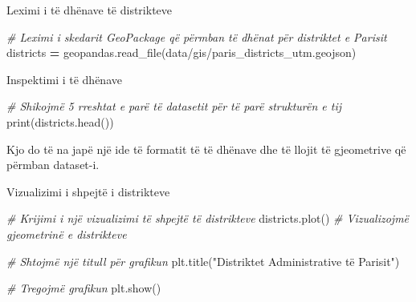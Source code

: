 \documentclass[
  ignorenonframetext,
]{beamer}
\newenvironment{Shaded}{\begin{snugshade}}{\end{snugshade}}
\newcommand{\BuiltInTok}[1]{#1}
\newcommand{\CommentTok}[1]{\textcolor[rgb]{0.56,0.35,0.01}{\textit{#1}}}
\newcommand{\NormalTok}[1]{#1}
\newcommand{\OperatorTok}[1]{\textcolor[rgb]{0.81,0.36,0.00}{\textbf{#1}}}
\newcommand{\StringTok}[1]{\textcolor[rgb]{0.31,0.60,0.02}{#1}}
\begin{document}
\begin{frame}[fragile]{Leximi i të dhënave të distrikteve}
\protect\hypertarget{leximi-i-tuxeb-dhuxebnave-tuxeb-distrikteve}{}

\begin{Shaded}
\begin{Highlighting}[]
\CommentTok{\# Leximi i skedarit GeoPackage që përmban të dhënat për distriktet e Parisit}
\NormalTok{districts }\OperatorTok{=}\NormalTok{ geopandas.read\_file(}\StringTok{\textquotesingle{}data/gis/paris\_districts\_utm.geojson\textquotesingle{}}\NormalTok{)}
\end{Highlighting}
\end{Shaded}
\end{frame}

\begin{frame}[fragile]{Inspektimi i të dhënave}
\protect\hypertarget{inspektimi-i-tuxeb-dhuxebnave-1}{}

\begin{Shaded}
\begin{Highlighting}[]
\CommentTok{\# Shikojmë 5 rreshtat e parë të datasetit për të parë strukturën e tij}
\BuiltInTok{print}\NormalTok{(districts.head())}
\end{Highlighting}
\end{Shaded}

Kjo do të na japë një ide të formatit të të dhënave dhe të llojit të
gjeometrive që përmban dataset-i.
\end{frame}

\begin{frame}[fragile]{Vizualizimi i shpejtë i distrikteve}
\protect\hypertarget{vizualizimi-i-shpejtuxeb-i-distrikteve}{}

\begin{Shaded}
\begin{Highlighting}[]
\CommentTok{\# Krijimi i një vizualizimi të shpejtë të distrikteve}
\NormalTok{districts.plot()  }\CommentTok{\# Vizualizojmë gjeometrinë e distrikteve}

\CommentTok{\# Shtojmë një titull për grafikun}
\NormalTok{plt.title(}\StringTok{"Distriktet Administrative të Parisit"}\NormalTok{)}

\CommentTok{\# Tregojmë grafikun}
\NormalTok{plt.show()}
\end{Highlighting}
\end{Shaded}
\end{frame}
\end{document}
